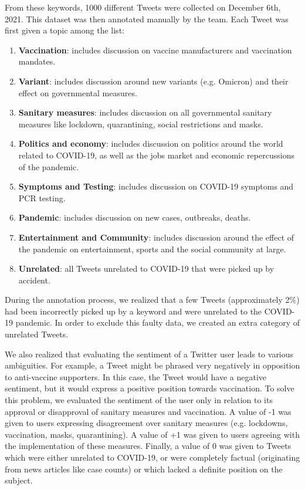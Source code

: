 \documentclass[letterpaper]{article} %
\begin{document}
\noindent From these keywords, 1000 different Tweets were collected on December 6th, 2021. This dataset was then annotated manually by the team. Each Tweet was first given a topic among the list: 
\begin{enumerate}
    \item \textbf{Vaccination}: includes discussion on vaccine manufacturers and vaccination mandates.
    \item \textbf{Variant}: includes discussion around new variants (e.g. Omicron) and their effect on governmental measures.  
    \item \textbf{Sanitary measures}: includes discussion on all governmental sanitary measures like lockdown, quarantining, social restrictions and masks. 
    \item \textbf{Politics and economy}: includes discussion on politics around the world related to COVID-19, as well as the jobs market and economic repercussions of the pandemic.
    \item \textbf{Symptoms and Testing}: includes discussion on COVID-19 symptoms and PCR testing.
    \item \textbf{Pandemic}: includes discussion on new cases, outbreaks, deaths. 
    \item \textbf{Entertainment and Community}: includes discussion around the effect of the pandemic on entertainment, sports and the social community at large. 
    \item \textbf{Unrelated}: all Tweets unrelated to COVID-19 that were picked up by accident. 
\end{enumerate}

\noindent During the annotation process, we realized that a few Tweets (approximately 2\%) had been incorrectly picked up by a keyword and were unrelated to the COVID-19 pandemic. In order to exclude this faulty data, we created an extra category of unrelated Tweets. 


\noindent We also realized that evaluating the sentiment of a Twitter user leads to various ambiguities. For example, a Tweet might be phrased very negatively in opposition to anti-vaccine supporters. In this case, the Tweet would have a negative sentiment, but it would express a positive position towards vaccination. To solve this problem, we evaluated the sentiment of the user only in relation to its approval or disapproval of sanitary measures and vaccination. A value of -1 was given to users expressing disagreement over sanitary measures (e.g. lockdowns, vaccination, masks, quarantining). A value of +1 was given to users agreeing with the implementation of these measures. Finally, a value of 0 was given to Tweets which were either unrelated to COVID-19, or were completely factual (originating from news articles like case counts) or which lacked a definite position on the subject. 
\end{document}
